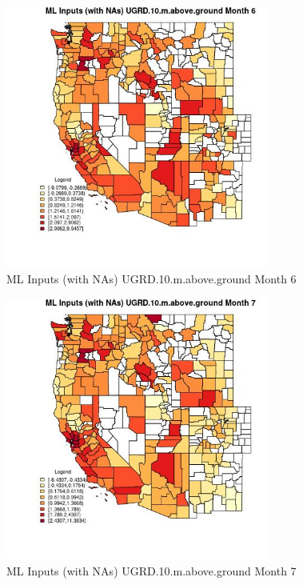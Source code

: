 \begin{figure} 
\centering  
\includegraphics[width=0.77\textwidth]{Code_Outputs/Report_ML_input_PM25_Step4_part_f_de_duplicated_aveswNAs_CountyUGRD10mabovegroundmedianMonth6.jpg} 
\caption{\label{fig:Report_ML_input_PM25_Step4_part_f_de_duplicated_aveswNAsCountyUGRD10mabovegroundmedianMonth6}ML Inputs (with NAs) UGRD.10.m.above.ground Month 6} 
\end{figure} 
 

\begin{figure} 
\centering  
\includegraphics[width=0.77\textwidth]{Code_Outputs/Report_ML_input_PM25_Step4_part_f_de_duplicated_aveswNAs_CountyUGRD10mabovegroundmedianMonth7.jpg} 
\caption{\label{fig:Report_ML_input_PM25_Step4_part_f_de_duplicated_aveswNAsCountyUGRD10mabovegroundmedianMonth7}ML Inputs (with NAs) UGRD.10.m.above.ground Month 7} 
\end{figure} 
 

